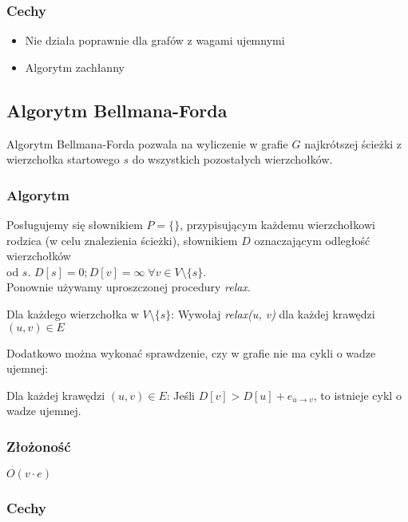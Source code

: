\documentclass[main.tex]{subfiles}
\begin{document}
    \subsubsection{Cechy}

    \begin{itemize}
        \item Nie działa poprawnie dla grafów z wagami ujemnymi
        \item Algorytm zachłanny
    \end{itemize}

    \subsection{Algorytm Bellmana-Forda}

    Algorytm Bellmana-Forda pozwala na wyliczenie w grafie $G$ najkrótszej ścieżki z
    wierzchołka startowego $s$ do wszystkich pozostałych wierzchołków.

    \subsubsection{Algorytm}

    Posługujemy się słownikiem $P = \{\}$, przypisującym każdemu wierzchołkowi
    rodzica (w celu znalezienia ścieżki), słownikiem $D$ oznaczającym odległość
    wierzchołków\\ od $s$. $D[s] = 0; D[v] = \infty \; \forall v \in V \setminus \{s\}$.
    \[\]
    Ponownie używamy uproszczonej procedury \textit{relax}.

    \[\]
    Dla każdego wierzchołka w $V \setminus \{s\}$:
    \vskip 0pt Wywołaj \textit{relax(u, v)} dla każdej krawędzi $(u, v) \in E$
    \[\]

    Dodatkowo można wykonać sprawdzenie, czy w grafie nie ma cykli o wadze ujemnej:

    \[\]
    Dla każdej krawędzi $(u, v) \in E$:
    \vskip 0pt Jeśli $D[v] > D[u] + e_{u \rightarrow v}$, to
    istnieje cykl o wadze ujemnej.
    \subsubsection{Złożoność}

    $O(v \cdot e)$

    \subsubsection{Cechy}
\end{document}
